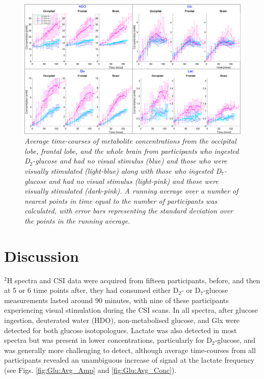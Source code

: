 \begin{figure}
    \centering
    \includegraphics[width = 1\textwidth]{Figures/Glucose/Vis_Stim.png}
    \caption{\textit{Average time-courses of metabolite concentrations from the occipital lobe, frontal lobe, and the whole brain from participants who ingested D$_2$-glucose and had no visual stimulus (blue) and those who were visually stimulated (light-blue) along with those who ingested D$_7$-glucose and had no visual stimulus (light-pink) and those were visually stimulated (dark-pink). A running average over a number of nearest points in time equal to the number of participants was calculated, with error bars representing the standard deviation over the points in the running average.}}
    \label{fig:Glu:Vis_Stim}
\end{figure}

\section{Discussion}

$^2$H spectra and \ac{CSI} data were acquired from fifteen participants, before, and then at 5 or 6 time points after, they had consumed either D$_2$- or D$_7$-glucose measurements lasted around 90 minutes, with nine of these participants experiencing visual stimulation during the \ac{CSI} scans. In all spectra, after glucose ingestion, deuterated water (\ac{HDO}), non-metabolised glucose, and Glx were detected for both glucose isotopologues. Lactate was also detected in most spectra but was present in lower concentrations, particularly for D$_2$-glucose, and was generally more challenging to detect, although average time-courses from all participants revealed an unambiguous increase of signal at the lactate frequency (see Figs. \ref{fig:Glu:Avg_Amp} and \ref{fig:Glu:Avg_Conc}). 

